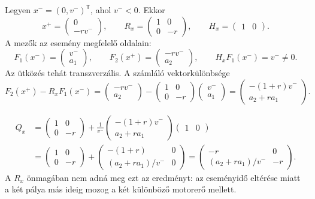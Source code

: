 Legyen $x^-=(0,v^-)^{\mathsf T}$, ahol $v^-<0$. Ekkor
\[
x^+=\begin{pmatrix}0\\-rv^-\end{pmatrix},\qquad
R_x=\begin{pmatrix}1&0\\0&-r\end{pmatrix},\qquad
H_x=\begin{pmatrix}1&0\end{pmatrix}.
\]
A mezők az esemény megfelelő oldalain:
\[
F_1(x^-)=\begin{pmatrix}v^-\\a_1\end{pmatrix},\qquad
F_2(x^+)=\begin{pmatrix}-rv^-\\a_2\end{pmatrix},\qquad
H_xF_1(x^-)=v^-\neq0.
\]
Az ütközés tehát transzverzális. A számláló vektorkülönbsége
\[
F_2(x^+)-R_xF_1(x^-)
=\begin{pmatrix}-rv^-\\a_2\end{pmatrix}
-\begin{pmatrix}1&0\\0&-r\end{pmatrix}\begin{pmatrix}v^-\\a_1\end{pmatrix}
=\begin{pmatrix}-(1+r)v^-\\a_2+ra_1\end{pmatrix}.
\]


\[
\begin{aligned}
Q_x&=\begin{pmatrix}1&0\\0&-r\end{pmatrix}
+\frac1{v^-}\begin{pmatrix}-(1+r)v^-\\a_2+ra_1\end{pmatrix}
\begin{pmatrix}1&0\end{pmatrix}\\[1mm]
&=\begin{pmatrix}1&0\\0&-r\end{pmatrix}
+\begin{pmatrix}-(1+r)&0\\(a_2+ra_1)/v^-&0\end{pmatrix}
=\boxed{\begin{pmatrix}-r&0\\(a_2+ra_1)/v^-&-r\end{pmatrix}}.
\end{aligned}
\]
A $R_x$ önmagában nem adná meg ezt az eredményt: az eseményidő eltérése miatt a két pálya más ideig mozog a két különböző motorerő mellett.


